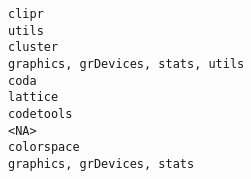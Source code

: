 \documentclass[
  letterpaper,
  DIV=11,
  numbers=noendperiod]{scrreprt}
\begin{document}
\begin{verbatim}
clipr                                                                                                                                                                                                                                                                                                                                                                                                                                                                                                                                                                                                                utils
cluster                                                                                                                                                                                                                                                                                                                                                                                                                                                                                                                                                                                  graphics, grDevices, stats, utils
coda                                                                                                                                                                                                                                                                                                                                                                                                                                                                                                                                                                                                               lattice
codetools                                                                                                                                                                                                                                                                                                                                                                                                                                                                                                                                                                                                             <NA>
colorspace                                                                                                                                                                                                                                                                                                                                                                                                                                                                                                                                                                                      graphics, grDevices, stats

\end{verbatim}
\end{document}
